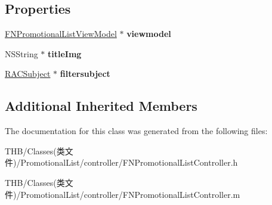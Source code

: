\subsection*{Properties}
\begin{DoxyCompactItemize}
\item 
\mbox{\label{interface_f_n_promotional_list_controller_ae46093e83bbd7d58679838448ef88d7a}} 
\mbox{\hyperlink{interface_f_n_promotional_list_view_model}{F\+N\+Promotional\+List\+View\+Model}} $\ast$ {\bfseries viewmodel}
\item 
\mbox{\label{interface_f_n_promotional_list_controller_ae5f4a659f1366edfc8666251e8cf2292}} 
N\+S\+String $\ast$ {\bfseries title\+Img}
\item 
\mbox{\label{interface_f_n_promotional_list_controller_a6e31da27ab68978bf74e27c695c87a35}} 
\mbox{\hyperlink{interface_r_a_c_subject}{R\+A\+C\+Subject}} $\ast$ {\bfseries filtersubject}
\end{DoxyCompactItemize}
\subsection*{Additional Inherited Members}


The documentation for this class was generated from the following files\+:\begin{DoxyCompactItemize}
\item 
T\+H\+B/\+Classes(类文件)/\+Promotional\+List/controller/F\+N\+Promotional\+List\+Controller.\+h\item 
T\+H\+B/\+Classes(类文件)/\+Promotional\+List/controller/F\+N\+Promotional\+List\+Controller.\+m\end{DoxyCompactItemize}
